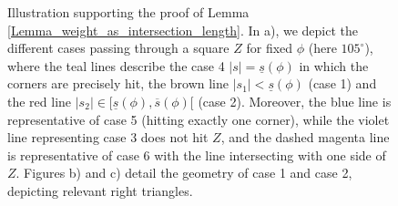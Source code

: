 \documentclass[11pt,reqno]{amsart}
\numberwithin{theorem}{section}
\theoremstyle{remark}
\begin{document}
\begin{figure}
\caption{Illustration supporting the proof of Lemma \ref{Lemma_weight_as_intersection_length}. In a), we depict the different cases passing through a square $Z$ for fixed $\phi$ (here $105^\circ$), where the teal lines describe the case 4 $|s|=\underline s(\phi)$ in which the corners are precisely hit, the brown line $|s_1|< \underline s(\phi)$ (case 1) and the red line $|s_2| \in [\underline s(\phi),\overline s(\phi)[$ (case 2). 
Moreover, the blue line is representative of case 5 (hitting exactly one corner), while the violet line representing case 3 does not hit $Z$, and the dashed magenta line is representative of case 6 with the line intersecting with one side of $Z$.
Figures b) and c)  detail  the geometry of case 1 and case 2, depicting relevant right triangles.}

\label{Fig_intersection_lengths}

\end{figure}



%
%
%
 
% 

%
\end{document}
